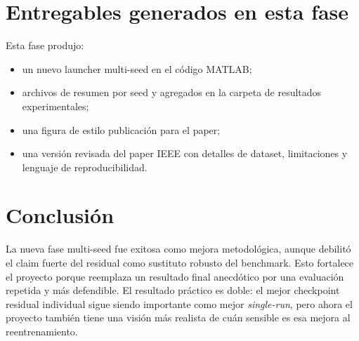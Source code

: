 \documentclass[11pt,a4paper]{article}
\begin{document}
\section*{Entregables generados en esta fase}
Esta fase produjo:
\begin{itemize}
    \item un nuevo launcher multi-seed en el c\'odigo MATLAB;
    \item archivos de resumen por seed y agregados en la carpeta de resultados experimentales;
    \item una figura de estilo publicaci\'on para el paper;
    \item una versi\'on revisada del paper IEEE con detalles de dataset, limitaciones y lenguaje de reproducibilidad.
\end{itemize}

\section*{Conclusi\'on}
La nueva fase multi-seed fue exitosa como mejora metodol\'ogica, aunque debilit\'o el claim fuerte del residual como sustituto robusto del benchmark. Esto fortalece el proyecto porque reemplaza un resultado final anecd\'otico por una evaluaci\'on repetida y m\'as defendible. El resultado pr\'actico es doble: el mejor checkpoint residual individual sigue siendo importante como mejor \emph{single-run}, pero ahora el proyecto tambi\'en tiene una visi\'on m\'as realista de cu\'an sensible es esa mejora al reentrenamiento.
\end{document}
